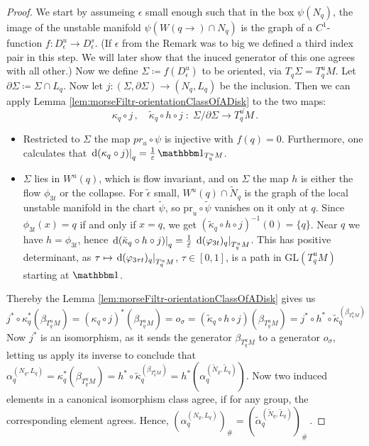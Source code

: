  \begin{proof}
	We start by assumeing $\epsilon$ small enough such that in the box $\psi(N_q)$, the image of the unstable manifold $\psi(W(q\to)\cap N_q)$ is the graph of a $C^1$-function $f: D^u_\epsilon\to D^s_\epsilon$. (If $\epsilon$ from the Remark was to big we defined a third index pair in this step. We will later show that the inuced generator of this one agrees with all other.) Now we define $\Sigma \coloneq f(D^u_\epsilon)$ to be oriented, via $T_q\Sigma=T^u_qM$. Let $\partial \Sigma \coloneq \Sigma \cap L_q$. Now let $j:(\Sigma,\partial \Sigma)\to (N_q,L_q)$ be the inclusion. Then we can apply Lemma \ref{lem:morseFiltr-orientationClassOfADisk} to the two maps:
	\begin{equation*}
    	\kappa_q\circ j\,,\quad \tilde{\kappa}_q\circ h\circ j\;:\;\Sigma/\partial\Sigma\to\overline{T^u_qM}\,.
	\end{equation*}

	\begin{itemize}
		\item Restricted to $\Sigma$ the map $pr_u\circ \psi$ is injective with $f(q)=0$. Furthermore, one calculates that $\restr{\diff(\kappa_q\circ j)}{q}=\tfrac{1}{\epsilon}\Idm_{T^u_qM}$.
		\item $\Sigma$ lies in $W^u(q)$, which is flow invariant, and on $\Sigma$ the map $h$ is either the
    flow $\phi_{3t}$ or the collapse. For $\tilde{\epsilon}$ small, $W^u(q)\cap \tilde{N}_q$ is the graph of the local
    unstable manifold in the chart $\tilde{\psi}$, so $\mathrm{pr}_u\circ\tilde{\psi}$ vanishes on it only at $q$.
    Since $\phi_{3t}(x)=q$ if and only if $x=q$, we get $(\tilde{\kappa}_q\circ h\circ j)^{-1}(0)=\{q\}$.
    Near $q$ we have $h=\phi_{3t}$, hence
    $\left.\mathop{}\!\mathrm{d}(\tilde{\kappa}_q\circ h\circ j)\right|_{q}=\tfrac{1}{\tilde{\varepsilon}}\,\left.\mathop{}\!\mathrm{d}(\varphi_{3t})_q\right|_{T^u_qM}$.
    This has positive determinant, as $\tau\mapsto \left.\mathop{}\!\mathrm{d}(\varphi_{3\tau t})_q\right|_{T^u_qM}$, $\tau\in[0,1]$,
    is a path in $\mathrm{GL}(T^u_qM)$ starting at $\Idm$.
	\end{itemize}
	Thereby the Lemma \ref{lem:morseFiltr-orientationClassOfADisk} gives us 
	\begin{equation*}
		j^*\circ \kappa_q^*(\beta_{T^u_qM})=(\kappa_q\circ j)^*(\beta_{T^u_qM})=o_\sigma=(\tilde{\kappa}_q\circ h\circ j)(\beta_{T^u_qM})=j^*\circ h^*\circ \tilde{\kappa}_q^(\beta_{T^u_qM})
	\end{equation*}
	Now $j^*$ is an isomorphism, as it sends the generator $\beta_{T^u_qM}$ to a generator $o_\sigma$, letting us apply its inverse to conclude that $\alpha_q^{(N_q,L_q)}=\kappa_q^*(\beta_{T^u_qM})= h^*\circ \tilde{\kappa}_q^(\beta_{T^u_qM})=h^*(\alpha_q^{(\tilde{N}_q,\tilde{L}_q)})$. Now two induced elements in a canonical isomorphism class agree, if for any group, the corresponding element agrees. Hence, $(\alpha_q^{(N_q,L_q)})_{\#}=(\tilde{\alpha}_q^{(\tilde{N}_q,\tilde{L}_q)})_{\#}\,.$
 \end{proof}



